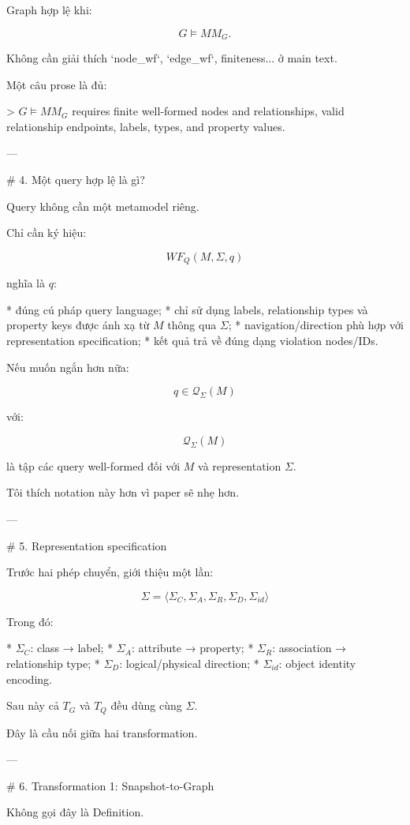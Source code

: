 Graph hợp lệ khi:

$$
\boxed{
G\models MM_G.
}
\tag{3}
$$

Không cần giải thích `node_wf`, `edge_wf`, finiteness... ở main text.

Một câu prose là đủ:

> \(G\models MM_G\) requires finite well-formed nodes and relationships, valid relationship endpoints, labels, types, and property values.

---

# 4. Một query hợp lệ là gì?

Query không cần một metamodel riêng.

Chỉ cần ký hiệu:

$$
\boxed{
WF_Q(M,\Sigma,q)
}
$$

nghĩa là \(q\):

* đúng cú pháp query language;
* chỉ sử dụng labels, relationship types và property keys được ánh xạ từ \(M\) thông qua \(\Sigma\);
* navigation/direction phù hợp với representation specification;
* kết quả trả về đúng dạng violation nodes/IDs.

Nếu muốn ngắn hơn nữa:

$$
\boxed{
q\in \mathcal Q_{\Sigma}(M)
}
\tag{4}
$$

với:

$$
\mathcal Q_{\Sigma}(M)
$$

là tập các query well-formed đối với \(M\) và representation \(\Sigma\).

Tôi thích notation này hơn vì paper sẽ nhẹ hơn.

---

# 5. Representation specification

Trước hai phép chuyển, giới thiệu một lần:

$$
\boxed{
\Sigma=
\langle
\Sigma_C,\Sigma_A,\Sigma_R,\Sigma_D,\Sigma_{id}
\rangle
}
$$

Trong đó:

* \(\Sigma_C\): class → label;
* \(\Sigma_A\): attribute → property;
* \(\Sigma_R\): association → relationship type;
* \(\Sigma_D\): logical/physical direction;
* \(\Sigma_{id}\): object identity encoding.

Sau này cả \(T_G\) và \(T_Q\) đều dùng cùng \(\Sigma\).

Đây là cầu nối giữa hai transformation.

---

# 6. Transformation 1: Snapshot-to-Graph

Không gọi đây là Definition.


